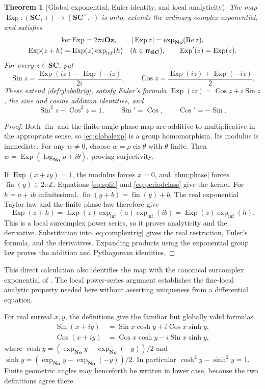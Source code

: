 \documentclass[11pt,letterpaper]{article}
\newtheorem{theorem}{Theorem}[section]
\theoremstyle{definition}
\theoremstyle{remark}
\newcommand{\No}{\mathbf{No}}
\newcommand{\SC}{\mathbf{SC}}
\newcommand{\Oz}{\mathbf{Oz}}
\newcommand{\Z}{\mathbb Z}\newcommand{\N}{\mathbb N}
\newcommand{\fin}{\operatorname{fin}}
\newcommand{\cis}{\operatorname{cis}}
\newcommand{\Sin}{\operatorname{Sin}}
\newcommand{\Cos}{\operatorname{Cos}}
\newcommand{\Exp}{\operatorname{Exp}}
\newcommand{\expi}{\operatorname{exp}_{\mathrm{inf}}}
\newcommand{\re}{\operatorname{Re}}\newcommand{\im}{\operatorname{Im}}
\numberwithin{equation}{section}
\begin{document}
\begin{theorem}[Global exponential, Euler identity, and local analyticity]\label{thm:globalexp}
The map $\Exp:(\SC,+)\to(\SC^\times,\cdot)$ is onto, extends the ordinary complex exponential, and satisfies
\begin{gather}\label{eq:expkernel}
 \ker\Exp=2\pi i\Oz,
 \qquad |\Exp z|=\exp_{\No}(\re z),\\
 \Exp(z+h)=\Exp(z)\expi(h)\quad(h\in\mm_{\SC}),\qquad
 \Exp'(z)=\Exp(z).\label{eq:explocal}
\end{gather}
For every $z\in\SC$, put
\begin{equation}\label{eq:complextrig}
 \Sin z=\frac{\Exp(iz)-\Exp(-iz)}{2i},\qquad
 \Cos z=\frac{\Exp(iz)+\Exp(-iz)}2.
\end{equation}
These extend \cref{def:globaltrig}, satisfy Euler's formula $\Exp(iz)=\Cos z+i\Sin z$, the sine and cosine addition identities, and
\[
 \Sin^2z+\Cos^2z=1,\qquad \Sin'=\Cos,\qquad\Cos'=-\Sin.
\]
\end{theorem}
\begin{proof}
Both $\fin$ and the finite-angle phase map are additive-to-multiplicative in the appropriate sense, so \eqref{eq:globalexp} is a group homomorphism. Its modulus is immediate. For any $w\ne0$, choose $w=\rho\cis\theta$ with $\theta$ finite. Then $w=\Exp(\log_{\No}\rho+i\theta)$, proving surjectivity.

If $\Exp(x+iy)=1$, the modulus forces $x=0$, and \cref{thm:phase} forces $\fin(y)\in2\pi\Z$. Equations \eqref{eq:split} and \eqref{eq:periodclass} give the kernel. For $h=a+ib$ infinitesimal, $\fin(y+b)=\fin(y)+b$. The real exponential Taylor law and the finite phase law therefore give
\[
 \Exp(z+h)=\Exp(z)\expi(a)\expi(ib)=\Exp(z)\expi(h).
\]
This is a local surcomplex power series, so it proves analyticity and the derivative. Substitution into \eqref{eq:complextrig} gives the real restriction, Euler's formula, and the derivatives. Expanding products using the exponential group law proves the addition and Pythagorean identities.
\end{proof}
This direct calculation also identifies the map with the canonical surcomplex exponential of \cite[Theorem 11.1]{EK}. The local power-series argument establishes the fine-local analytic property needed here without asserting uniqueness from a differential equation.

For real surreal $x,y$, the definitions give the familiar but globally valid formulas
\begin{align}\label{eq:trighyper}
 \Sin(x+iy)&=\Sin x\cosh y+i\Cos x\sinh y,\\
 \Cos(x+iy)&=\Cos x\cosh y-i\Sin x\sinh y,\nonumber
\end{align}
where $\cosh y=(\exp_{\No}y+\exp_{\No}(-y))/2$ and $\sinh y=(\exp_{\No}y-\exp_{\No}(-y))/2$. In particular $\cosh^2y-\sinh^2y=1$. Finite geometric angles may henceforth be written in lower case, because the two definitions agree there.
\end{document}
